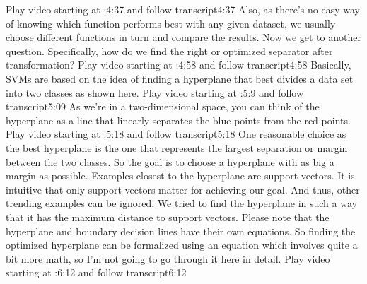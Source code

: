 	Play video starting at :4:37 and follow transcript4:37
	Also, as there's no easy way of knowing which function performs best with any given dataset, we usually choose different functions in turn and compare the results. Now we get to another question. Specifically, how do we find the right or optimized separator after transformation?
	Play video starting at :4:58 and follow transcript4:58
	Basically, SVMs are based on the idea of finding a hyperplane that best divides a data set into two classes as shown here.
	Play video starting at :5:9 and follow transcript5:09
	As we're in a two-dimensional space, you can think of the hyperplane as a line that linearly separates the blue points from the red points.
	Play video starting at :5:18 and follow transcript5:18
	One reasonable choice as the best hyperplane is the one that represents the largest separation or margin between the two classes. So the goal is to choose a hyperplane with as big a margin as possible. Examples closest to the hyperplane are support vectors. It is intuitive that only support vectors matter for achieving our goal. And thus, other trending examples can be ignored. We tried to find the hyperplane in such a way that it has the maximum distance to support vectors. Please note that the hyperplane and boundary decision lines have their own equations. So finding the optimized hyperplane can be formalized using an equation which involves quite a bit more math, so I'm not going to go through it here in detail.
	Play video starting at :6:12 and follow transcript6:12
